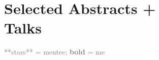 \documentclass[10pt]{cooperCV2}
\begin{document}
%	






\section{Selected Abstracts + \\Talks}
\textcolor{grey}{**stars** = mentee; \textbf{bold} = me}\\
\end{document}
